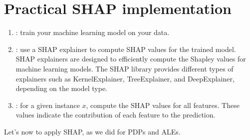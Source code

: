 \documentclass[letterpaper,10pt,english]{jupyterBook}
\begin{document}
\section{Practical SHAP implementation}
\label{\detokenize{notebooks/shapley:practical-shap-implementation}}\begin{enumerate}
%
\item {} 
\sphinxAtStartPar
{}: train your machine learning model on your data.

\item {} 
\sphinxAtStartPar
{}: use a SHAP explainer to compute SHAP values for the trained model. SHAP explainers are designed to efficiently compute the Shapley values for machine learning models. The SHAP library provides different types of explainers such as KernelExplainer, TreeExplainer, and DeepExplainer, depending on the model type.

\item {} 
\sphinxAtStartPar
{}: for a given instance \(x\), compute the SHAP values for all features. These values indicate the contribution of each feature to the prediction.

\end{enumerate}

\sphinxAtStartPar
Let’s now  to apply SHAP, as we did for PDPs and ALEs.
\end{document}
